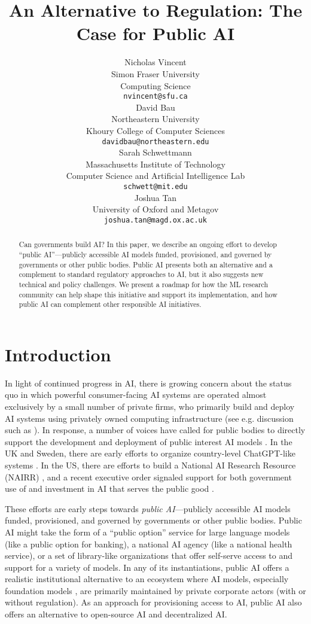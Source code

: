 \documentclass{article}
\title{An Alternative to Regulation: The Case for Public AI}
\author{
  Nicholas Vincent \\
  Simon Fraser University \\
  Computing Science \\
  \texttt{nvincent@sfu.ca} \\
  \And
  David Bau \\
  Northeastern University \\
  Khoury College of Computer Sciences \\
  \texttt{davidbau@northeastern.edu} \\
  \And
  Sarah Schwettmann \\
  Massachusetts Institute of Technology \\
  Computer Science and Artificial Intelligence Lab \\
  \texttt{schwett@mit.edu} \\
  \And
  Joshua Tan \\
  University of Oxford and Metagov \\
  \texttt{joshua.tan@magd.ox.ac.uk} \\
}
\begin{document}
\maketitle

\begin{abstract}
Can governments build AI? In this paper, we describe an ongoing effort to develop ``public AI''---publicly accessible AI models funded, provisioned, and governed by governments or other public bodies. Public AI presents both an alternative and a complement to standard regulatory approaches to AI, but it also suggests new technical and policy challenges. We present a roadmap for how the ML research community can help shape this initiative and support its implementation, and how public AI can complement other responsible AI initiatives.
\end{abstract}

\section{Introduction}
In light of continued progress in AI, there is growing concern about the status quo in which powerful consumer-facing AI systems are operated almost exclusively by a small number of private firms, who primarily build and deploy AI systems using privately owned computing infrastructure (see e.g. discussion such as \cite{vincentAIEnteringEra2023,widderOpenBusinessBig2023,sadowski_everyone_2021}).
In response, a number of voices have called for public bodies to directly support the development and deployment of public interest AI models \cite{jenningsOpinionThereOnly2023,schneierHowArtificialIntelligence2023,sandersBuildAIPeople2023}. In the UK and Sweden, there are early efforts to organize country-level ChatGPT-like systems \cite{belfieldGreatBritishCloud2023, ukparliamentGovernanceArtificialIntelligence2023,AISwedenAdvancing2023}. In the US, there are efforts to build a National AI Research Resource (NAIRR) \cite{lynchNewReportDetails2023}, and a recent executive order signaled support for both government use of and investment in AI that serves the public good \cite{thewhitehouseFACTSHEETPresident2023}.

These efforts are early steps towards \emph{public AI}---publicly accessible AI models funded, provisioned, and governed by governments or other public bodies. 
Public AI might take the form of a ``public option'' service for large language models (like a public option for banking), a national AI agency (like a national health service), or a set of library-like organizations that offer self-serve access to and support for a variety of models.
In any of its instantiations, public AI offers a realistic institutional alternative to an ecosystem where AI models, especially foundation models \cite{bommasani2021opportunities}, are primarily maintained by private corporate actors (with or without regulation). As an approach for provisioning access to AI, public AI also offers an alternative to open-source AI and decentralized AI. 
\end{document}
